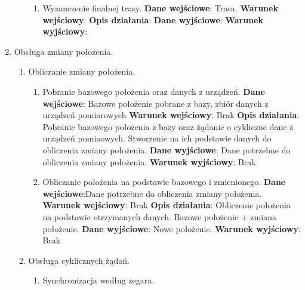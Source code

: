 \documentclass[11pt]{article}
\begin{document}
\begin{enumerate}
\begin{enumerate}[label*=\arabic*.]
\begin{enumerate}[label*=\arabic*.]
				\item Wyzanczenie finalnej trasy. \newline
				\textbf{Dane wejściowe}: Trasa.	\newline
				\textbf{Warunek wejściowy}: 		\newline   	
				\textbf{Opis działania}:	\newline
				\textbf{Dane wyjściowe}:	\newline
				\textbf{Warunek wyjściowy}:
			\end{enumerate}
		\end{enumerate}
		\item Obsługa zmiany położenia.
		\begin{enumerate}[label*=\arabic*.]
			\item Obliczanie zmiany położenia.
			\begin{enumerate}[label*=\arabic*.]
				\item Pobranie bazowego położenia oraz danych z urządzeń. \newline
				\textbf{Dane wejściowe}: Bazowe położenie pobrane z bazy, zbiór danych z urządzeń pomiarowych	\newline
				\textbf{Warunek wejściowy}: Brak		\newline   	
				\textbf{Opis działania}: Pobranie bazowego położenia z bazy oraz żądanie o cykliczne dane z urządzeń pomiaowych. Stworzenie na ich podstawie danych do obliczenia zmiany położenia.	\newline
				\textbf{Dane wyjściowe}: Dane potrzebne do obliczenia zmiany położenia.	\newline
				\textbf{Warunek wyjściowy}: Brak
				\item Obliczanie położenia na podstawie bazowego i zmienionego. \newline
				\textbf{Dane wejściowe}:Dane potrzebne do obliczenia zmiany położenia.	\newline
				\textbf{Warunek wejściowy}: Brak		\newline   	
				\textbf{Opis działania}: Obliczenie położenia na podstawie otrzymanych danych. Bazowe położenie + zmiana położenie.	\newline
				\textbf{Dane wyjściowe}: Nowe położenie.	\newline
				\textbf{Warunek wyjściowy}: Brak
			\end{enumerate}
			\item Obsługa cyklicznych żądań.
			\begin{enumerate}[label*=\arabic*.]
				\item Synchronizacja według zegara. \newline

\end{enumerate}
\end{enumerate}
\end{enumerate}
\end{document}
